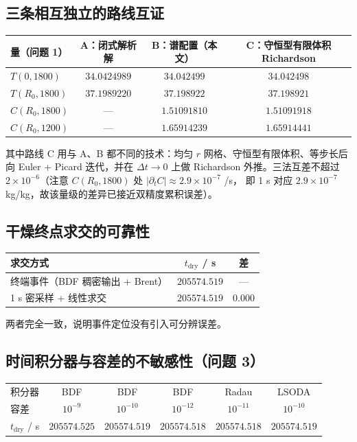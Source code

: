 \documentclass[11pt,a4paper]{article}
\theoremstyle{definition}
\begin{document}
\subsection{三条相互独立的路线互证}

\begin{center}
\small
\begin{tabular}{@{}lccc@{}}
\toprule
量（问题 1） & A：闭式解析解 & B：谱配置（本文） & C：守恒型有限体积 Richardson \\
\midrule
$T(0,1800)$ & $34.0424989$ & $34.042499$ & $34.042498$ \\
$T(R_0,1800)$ & $37.1989220$ & $37.198922$ & $37.198921$ \\
$C(R_0,1800)$ & --- & $1.51091810$ & $1.51091918$ \\
$C(R_0,1200)$ & --- & $1.65914239$ & $1.65914441$ \\
\bottomrule
\end{tabular}
\end{center}

其中路线 C 用与 A、B 都不同的技术：均匀 $r$ 网格、守恒型有限体积、等步长后向 Euler +
Picard 迭代，并在 $\Delta t\to0$ 上做 Richardson 外推。三法互差不超过
$2\times10^{-6}$（注意 $C(R_0,1800)$ 处 $|\partial_tC|\approx2.9\times10^{-7}$ /s，
即 1 s 对应 $2.9\times10^{-7}$ kg/kg，故该量级的差异已接近双精度累积误差）。

\subsection{干燥终点求交的可靠性}

\begin{center}
\small
\begin{tabular}{@{}lcc@{}}
\toprule
求交方式 & $t_{\text{dry}}$ / s & 差 \\
\midrule
终端事件（BDF 稠密输出 + Brent） & $205574.519$ & --- \\
1 s 密采样 + 线性求交 & $205574.519$ & $0.000$ \\
\bottomrule
\end{tabular}
\end{center}
两者完全一致，说明事件定位没有引入可分辨误差。

\subsection{时间积分器与容差的不敏感性（问题 3）}

\begin{center}
\small
\begin{tabular}{@{}lccccc@{}}
\toprule
积分器 & BDF & BDF & BDF & Radau & LSODA \\
容差 & $10^{-9}$ & $10^{-10}$ & $10^{-12}$ & $10^{-11}$ & $10^{-10}$ \\
\midrule
$t_{\text{dry}}$ / s & $205574.525$ & $205574.519$ & $205574.518$ & $205574.518$ & $205574.519$ \\
\bottomrule
\end{tabular}
\end{center}
\end{document}
